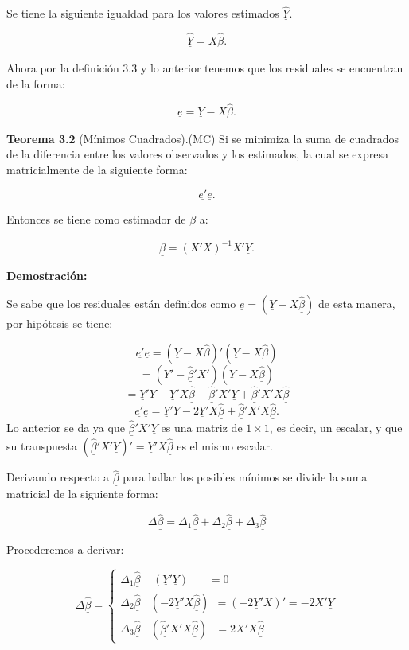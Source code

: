 \documentclass[a4paper,oneside,openany]{book}
\begin{document}
Se tiene la siguiente igualdad para los valores estimados
\(\underline{\hat{Y}}.\)

\[\underline{\hat{Y}}=X \underline{\hat{\beta}}.\]

Ahora por la definición 3.3 y lo anterior tenemos que los residuales se
encuentran de la forma:

\[\underline{e}=\underline{Y}-X \underline{\hat{\beta}}.\]

\textbf{Teorema 3.2} (Mínimos Cuadrados).(MC) Si se minimiza la suma de
cuadrados de la diferencia entre los valores observados y los estimados,
la cual se expresa matricialmente de la siguiente forma:

\[\underline{e'}\underline{e}.\]

Entonces se tiene como estimador de \(\underline{\beta}\) a:

\[\underline{\hat{\beta}}=\left( X'X\right)^{-1}X'\underline{Y}.\]

\textbf{Demostración:}

Se sabe que los residuales están definidos como
\(\underline{e}=\left( \underline{Y}-X \underline{\hat{\beta}}\right)\)
de esta manera, por hipótesis se tiene:

\[\underline{e'}\underline{e}=\left( \underline{Y}-X \underline{\hat{\beta}}\right)'\left( \underline{Y}-X \underline{\hat{\beta}}\right)\]
\[=\left(\underline{Y}'- \underline{\hat{\beta}}'X'\right)\left( \underline{Y}-X \underline{\hat{\beta}}\right)\]
\[=\underline{Y}'Y-\underline{Y}'X\underline{\hat{\beta}}-\underline{\hat{\beta}}'X'\underline{Y}+\underline{\hat{\beta}}'X'X\underline{\hat{\beta}}\]
\[\underline{e'}\underline{e}=\underline{Y}'Y-2\underline{Y}'X\underline{\hat{\beta}}+\underline{\hat{\beta}}'X'X\underline{\hat{\beta}}.\]
Lo anterior se da ya que \(\underline{\hat{\beta}}'X'\underline{Y}\) es
una matriz de \(1\times 1\), es decir, un escalar, y que su transpuesta
\((\underline{\hat{\beta}}'X'\underline{Y})'=\underline{Y}'X\underline{\hat{\beta}}\)
es el mismo escalar.

Derivando respecto a \(\underline{\hat{\beta}}\) para hallar los
posibles mínimos se divide la suma matricial de la siguiente forma:

\[\Delta \underline{\hat\beta}=\Delta_{1} \underline{\hat{\beta}}+\Delta_{2} \underline{\hat{\beta}}+\Delta_{3} \underline{\hat{\beta}}\]

Procederemos a derivar:

\[
\Delta\underline{\hat{\beta}}=\left\{
\begin{array}{ll}
\Delta_{1} \underline{\hat{\beta}} \ \ \ \ \ \left(\underline{Y}'\underline{Y}\right)  \ \ \ \ \ \ \ \ =0 \\
\Delta_{2} \underline{\hat{\beta}} \ \ \ \ \left( -2\underline{Y}'X\underline{\hat{\beta}}\right) \ \ = \left(-2\underline{Y}'X\right)'=-2X'\underline{Y} \\
\Delta_{3} \underline{\hat{\beta}} \ \  \ \ \left( \underline{\hat{\beta}'}X'X\underline{\hat{\beta}}\right)  \ \ \ = 2X'X\underline{\hat{\beta}}
\end{array}
\right. 
\]
\end{document}
